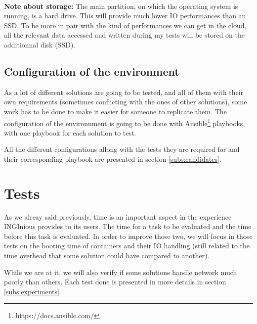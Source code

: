\paragraph{}\textbf{Note about storage:} The main partition, on which the operating system is running, is a hard drive.  This will provide much lower IO performances than an SSD.  To be more in pair with the kind of performances we can get in the cloud, all the relevant data accessed and written during my tests will be stored on the additionnal disk (SSD).

\subsection{Configuration of the environment}
As a lot of different solutions are going to be tested, and all of them with their own requirements (sometimes conflicting with the ones of other solutions), some work has to be done to make it easier for someone to replicate them.  The configuration of the environnment is going to be done with Ansible\footnote{https://docs.ansible.com/} playbooks, with one playbook for each solution to test.

All the different configurations allong with the tests they are required for and their corresponding playbook are presented in section \ref{subs:candidates}.

\section{Tests}
As we alreay said previously, time is an important aspect in the experience INGInious provides to its users.  The time for a task to be evaluated and the time before this task is evaluated.  In order to improve those two, we will focus in those tests on the booting time of containers and their IO handling (still related to the time overhead that some solution could have compared to another).  %

While we are at it, we will also verify if some solutions handle network much poorly than others.  Each test done is presented in more details in section \ref{subs:experiments}.


